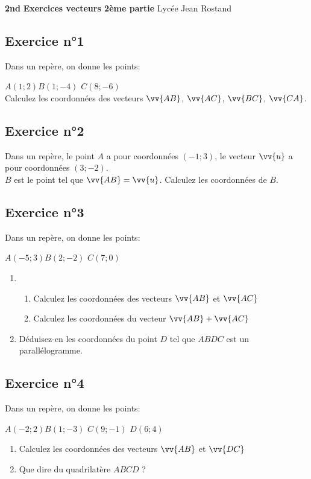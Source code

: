 \documentclass[12pt,a4paper]{article}
\begin{document}
\textbf{2nd} \hfill \textbf{Exercices vecteurs 2ème partie} \hfill Lycée Jean Rostand\\
\trait 

\subsection*{Exercice n°1}

Dans un repère, on donne les points:

$A(1;2)$\qquad $B(1;-4)$ \qquad $C(8;-6)$\\
Calculez les coordonnées des vecteurs $\vv{AB}$, $\vv{AC}$, $\vv{BC}$, $\vv{CA}$.

\subsection*{Exercice n°2}

Dans un repère, le point $A$ a pour coordonnées $(-1;3)$, le vecteur $\vv{u}$ a pour coordonnées $(3;-2)$.\\
$B$ est le point tel que $\vv{AB}=\vv{u}$.
Calculez les coordonnées de $B$.

\subsection*{Exercice n°3}

Dans un repère, on donne les points:

$A(-5;3)$\qquad $B(2;-2)$ \qquad $C(7;0)$

\begin{enumerate}
    \item 
    \begin{enumerate}
        \item Calculez les coordonnées des vecteurs $\vv{AB}$ et $\vv{AC}$
        \item Calculez les coordonnées du vecteur $\vv{AB}+\vv{AC}$
    \end{enumerate}
    \item Déduisez-en les coordonnées du point $D$ tel que $ABDC$ est un parallélogramme.
\end{enumerate}

\subsection*{Exercice n°4}

Dans un repère, on donne les points:

$A(-2;2)$\qquad $B(1;-3)$ \qquad $C(9;-1)$ \qquad $D(6;4)$
\begin{enumerate}
    \item Calculez les coordonnées des vecteurs $\vv{AB}$ et $\vv{DC}$
    \item Que dire du quadrilatère $ABCD$ ?
\end{enumerate}
\end{document}
